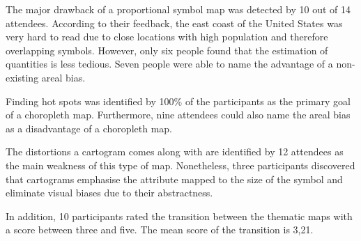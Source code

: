 The major drawback of a proportional symbol map was detected by 10 out of 14 attendees. According to their feedback, the east coast of the United States was very hard to read due to close locations with high population and therefore overlapping symbols. However, only six people found that the estimation of quantities is less tedious. Seven people were able to name the advantage of a non-existing areal bias.

Finding hot spots was identified by 100\% of the participants as the primary goal of a choropleth map. Furthermore, nine attendees could also name the areal bias as a disadvantage of a choropleth map.

The distortions a cartogram comes along with are identified by 12 attendees as the main weakness of this type of map. Nonetheless, three participants discovered that cartograms emphasise the attribute mapped to the size of the symbol and eliminate visual biases due to their abstractness.

In addition, 10 participants rated the transition between the thematic maps with a score between three and five. The mean score of the transition is 3,21.